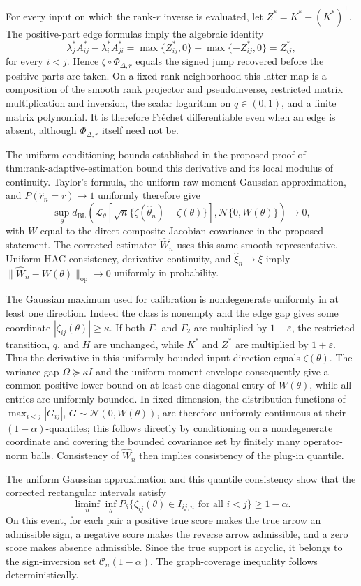 For every input on which the rank-\(r\) inverse is evaluated, let \(Z^*=K^*-(K^*)^{\mathsf T}\).  The positive-part edge formulas imply the algebraic identity
\[
 \lambda_j^*A_{ij}^*-\lambda_i^*A_{ji}^*
 =\max\{Z_{ij}^*,0\}-\max\{-Z_{ij}^*,0\}=Z_{ij}^*,
\]
for every \(i<j\).  Hence \(\zeta\circ\Phi_{\Delta,r}\) equals the signed jump recovered before the positive parts are taken.  On a fixed-rank neighborhood this latter map is a composition of the smooth rank projector and pseudoinverse, restricted matrix multiplication and inversion, the scalar logarithm on \(q\in(0,1)\), and a finite matrix polynomial.  It is therefore Fr\'{e}chet differentiable even when an edge is absent, although \(\Phi_{\Delta,r}\) itself need not be.

The uniform conditioning bounds established in the proposed proof of \(\text{thm:rank-adaptive-estimation}\) bound this derivative and its local modulus of continuity.  Taylor's formula, the uniform raw-moment Gaussian approximation, and \(P(\widehat r_n=r)\to1\) uniformly therefore give
\[
 \sup_\theta d_{\mathrm{BL}}\left(
 \mathcal L_\theta\left[\sqrt n\{\zeta(\widehat\theta_n)-\zeta(\theta)\}\right],
 \mathcal N\{0,W(\theta)\}\right)\to0,
\]
with \(W\) equal to the direct composite-Jacobian covariance in the proposed statement.  The corrected estimator \(\widehat W_n\) uses this same smooth representative.  Uniform HAC consistency, derivative continuity, and \(\widehat\xi_n\to\xi\) imply \(\|\widehat W_n-W(\theta)\|_{\mathrm{op}}\to0\) uniformly in probability.

The Gaussian maximum used for calibration is nondegenerate uniformly in at least one direction.  Indeed the class is nonempty and the edge gap gives some coordinate \(|\zeta_{ij}(\theta)|\geq\kappa\).  If both \(\Gamma_1\) and \(\Gamma_2\) are multiplied by \(1+\varepsilon\), the restricted transition, \(q\), and \(H\) are unchanged, while \(K^*\) and \(Z^*\) are multiplied by \(1+\varepsilon\).  Thus the derivative in this uniformly bounded input direction equals \(\zeta(\theta)\).  The variance gap \(\Omega\succeq\kappa I\) and the uniform moment envelope consequently give a common positive lower bound on at least one diagonal entry of \(W(\theta)\), while all entries are uniformly bounded.  In fixed dimension, the distribution functions of \(\max_{i<j}|G_{ij}|\), \(G\sim\mathcal N(0,W(\theta))\), are therefore uniformly continuous at their \((1-\alpha)\)-quantiles; this follows directly by conditioning on a nondegenerate coordinate and covering the bounded covariance set by finitely many operator-norm balls.  Consistency of \(\widehat W_n\) then implies consistency of the plug-in quantile.

The uniform Gaussian approximation and this quantile consistency show that the corrected rectangular intervals satisfy
\[
 \liminf_n\inf_\theta P_\theta\{\zeta_{ij}(\theta)\in I_{ij,n}\text{ for all }i<j\}\geq1-\alpha.
\]
On this event, for each pair a positive true score makes the true arrow an admissible sign, a negative score makes the reverse arrow admissible, and a zero score makes absence admissible.  Since the true support is acyclic, it belongs to the sign-inversion set \(\mathcal C_n(1-\alpha)\).  The graph-coverage inequality follows deterministically.